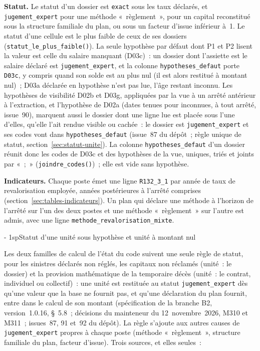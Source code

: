\documentclass[a4paper,11pt]{article}
\makeatletter
\newcommand{\titrebandeau}[1]{%
  \noindent{\color{financeblue}\rule{\linewidth}{2.5pt}}
  \par\vspace{5mm}
  {\color{greenline}\raggedright\fontsize{19}{23}\bfseries\selectfont #1\par}
  \vspace{6mm}}
\newcommand{\charte@bandeau}[1]{%
  \parindent\z@ \everypar{\strut}%
  {\strut\par}\nobreak
  \titrebandeau{#1}\nobreak
  \kern\z@\nobreak\strut\par}
\newcommand{\charte@reserve}[1]{\par\ifinner\else\if@nobreak\else
  \penalty\z@ %
  \begingroup\setlength{\dimen@}{#1}%
  \dimen@ii\pagegoal \advance\dimen@ii-\pagetotal
  \ifdim\pagegoal=\maxdimen\else\ifdim\dimen@>\dimen@ii
    \vfil\penalty-\@M %
  \fi\fi\endgroup\fi\fi}
\renewcommand{\section}{\charte@reserve{12\baselineskip}%
  \@startsection{section}{1}{\z@}%
  {\z@}{1sp}{\normalfont\charte@bandeau}}
\newcommand{\code}[1]{\texttt{\small #1}}
\makeatother
\begin{document}
\textbf{Statut.} Le statut d'un dossier est \code{exact} sous les taux
déclarés, et \code{jugement\_expert} pour une méthode «~règlement~», pour un
capital reconstitué sous la structure familiale du plan, ou sous un facteur
d'issue inférieur à~1. Le statut d'une cellule est le plus faible de ceux de
ses dossiers (\code{statut\_le\_plus\_faible()}). La seule hypothèse
par défaut dont P1 et P2 lisent la valeur est celle du salaire manquant
(D03c)~: un dossier dont l'assiette est le salaire déclaré est
\code{jugement\_expert}, et la colonne \code{hypotheses\_defaut} porte
\code{D03c}, y compris quand son solde est au plus nul (il est alors
restitué à montant nul)~; D03a déclarée en hypothèse n'est pas lue, l'âge
restant inconnu. Les hypothèses de visibilité D02b et D03g, appliquées par
la vue à un arrêté antérieur à l'extraction, et l'hypothèse de D02a
(dates tenues pour inconnues, à tout arrêté, issue~90), marquent aussi le
dossier dont une ligne lue est placée sous l'une d'elles, qu'elle l'ait
rendue visible ou cachée~: le dossier est \code{jugement\_expert} et ses codes
vont dans \code{hypotheses\_defaut} (issue~87 du dépôt~; règle unique de
statut, section~\ref{sec:statut-unite}). La colonne
\code{hypotheses\_defaut} d'un dossier réunit donc les codes de D03c et
des hypothèses de la vue, uniques, triés et joints par «~;~»
(\code{joindre\_codes()})~; elle est vide sans hypothèse.

\textbf{Indicateurs.} Chaque poste émet une ligne \code{R132\_3\_1} par
année de taux de revalorisation employée, années postérieures à l'arrêté
comprises (section~\ref{sec:tables-indicateurs}). Un plan qui déclare une
méthode à l'horizon de l'arrêté sur l'un des deux postes et une méthode
«~règlement~» sur l'autre est admis, avec une ligne
\code{methode\_revalorisation\_mixte}.

\section{Statut d'une unité sous hypothèse et unité à montant nul}
\label{sec:statut-unite}

Les deux familles de calcul de l'état du code suivent une seule règle de
statut, pour les sinistres déclarés non réglés, les capitaux non réclamés
(unité~: le dossier) et la provision mathématique de la temporaire décès
(unité~: le contrat, individuel ou collectif)~: une unité est restituée au
statut \code{jugement\_expert} dès qu'une valeur que la base ne fournit
pas, et qu'une déclaration du plan fournit, entre dans le calcul de son
montant (spécification de la branche B2, version~1.0.16, §~5.8~;
décisions du mainteneur du 12~novembre~2026, M310 et M311~; issues~87,
91 et~92 du dépôt). La règle s'ajoute aux autres causes de
\code{jugement\_expert} propres à chaque poste (méthode «~règlement~»,
structure familiale du plan, facteur d'issue). Trois sources, et elles
seules~:
\end{document}

